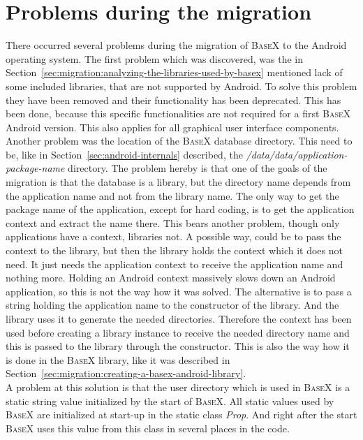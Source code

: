 \section{Problems during the migration}
\label{sec:migration:problems-during-the-migration}
There occurred several problems during the migration of \textsc{BaseX} to the Android operating system.
The first problem which was discovered, was the in Section~\ref{sec:migration:analyzing-the-libraries-used-by-basex} mentioned lack of some included libraries, that are not supported by Android.
To solve this problem they have been removed and their functionality has been deprecated.
This has been done, because this specific functionalities are not required for a first \textsc{BaseX} Android version.
This also applies for all graphical user interface components.\\
Another problem was the location of the \textsc{BaseX} database directory.
This need to be, like in Section~\ref{sec:android-internals} described, the \textit{/data/data/application-package-name} directory.
The problem hereby is that one of the goals of the migration is that the database is a library, but the directory name depends from the application name and not from the library name.
The only way to get the package name of the application, except for hard coding, is to get the application context and extract the name there.
This bears another problem, though only applications have a context, libraries not. 
A possible way, could be to pass the context to the library, but then the library holds the context which it does not need.
It just needs the application context to receive the application name and nothing more.
Holding an Android context massively slows down an Android application, so this is not the way how it was solved.
The alternative is to pass a string holding the application name to the constructor of the library.
And the library uses it to generate the needed directories.
Therefore the context has been used before creating a library instance to receive the needed directory name and this is passed to the library through the constructor.
This is also the way how it is done in the \textsc{BaseX} library, like it was described in Section~\ref{sec:migration:creating-a-basex-android-library}.\\
A problem at this solution is that the user directory which is used in \textsc{BaseX} is a static string value initialized by the start of \textsc{BaseX}.
All static values used by \textsc{BaseX} are initialized at start-up in the static class \textit{Prop}.
And right after the start \textsc{BaseX} uses this value from this class in several places in the code.
